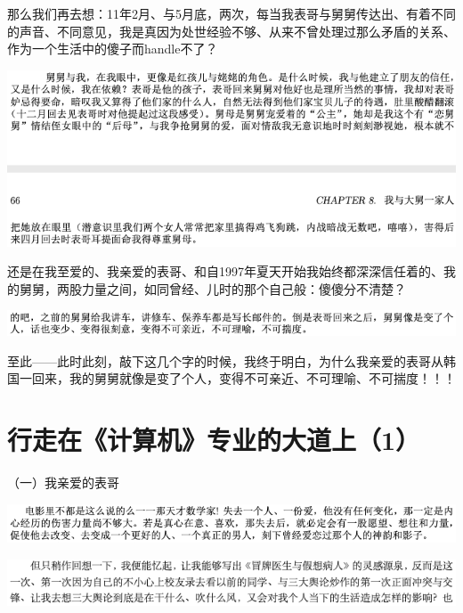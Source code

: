 \documentclass[9pt, b5paper]{article}
\begin{document}
那么我们再去想：11年2月、与5月底，两次，每当我表哥与舅舅传达出、有着不同的声音、不同意见，我是真因为处世经验不够、从来不曾处理过那么矛盾的关系、作为一个生活中的傻子而handle不了？

\begin{center}
\includegraphics[width=.9\linewidth]{./pic/backups_plans_20210423_103059.png}
\end{center}

还是在我至爱的、我亲爱的表哥、和自1997年夏天开始我始终都深深信任着的、我的舅舅，两股力量之间，如同曾经、儿时的那个自己般：傻傻分不清楚？

\begin{center}
\includegraphics[width=.9\linewidth]{./pic/backups_plans_20210422_232937.png}
\end{center}

至此——此时此刻，敲下这几个字的时候，我终于明白，为什么我亲爱的表哥从韩国一回来，我的舅舅就像是变了个人，变得不可亲近、不可理喻、不可揣度！！！


\section{行走在《计算机》专业的大道上（1）}
\label{sec:org792d3af}

（一）我亲爱的表哥

\begin{center}
\includegraphics[width=.9\linewidth]{./pic/backups_plans_20210420_115239.png}
\end{center}

\begin{center}
\includegraphics[width=.9\linewidth]{./pic/backups_plans_20210424_085313.png}
\end{center}
\end{document}
